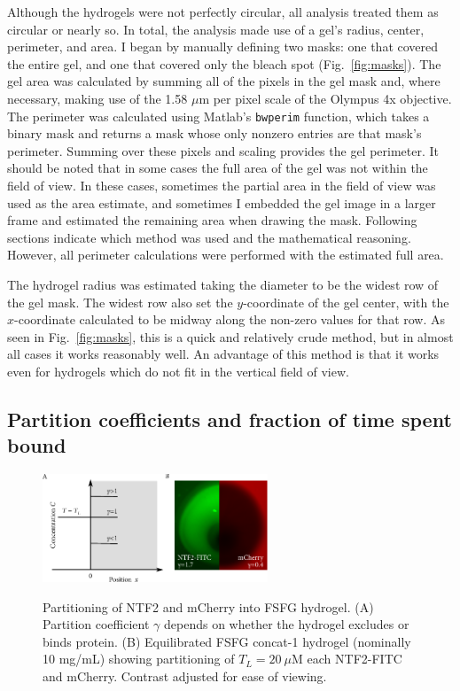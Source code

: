 Although the hydrogels were not perfectly circular, all analysis treated them as circular or nearly so.  In total, the analysis made use of a gel's radius, center, perimeter, and area.  I began by manually defining two masks: one that covered the entire gel, and one that covered only the bleach spot (Fig.~\ref{fig:masks}).  The gel area was calculated by summing all of the pixels in the gel mask and, where necessary, making use of the 1.58 $\mu$m per pixel scale of the Olympus 4x objective.  The perimeter was calculated using Matlab's \texttt{bwperim} function, which takes a binary mask and returns a mask whose only nonzero entries are that mask's perimeter.  Summing over these pixels and scaling provides the gel perimeter.  It should be noted that in some cases the full area of the gel was not within the field of view.  In these cases, sometimes the partial area in the field of view was used as the area estimate, and sometimes I embedded the gel image in a larger frame and estimated the remaining area when drawing the mask.  Following sections indicate which method was used and the mathematical reasoning.  However, all perimeter calculations were performed with the estimated full area.

The hydrogel radius was estimated taking the diameter to be the widest row of the gel mask.  The widest row also set the $y$-coordinate of the gel center, with the $x$-coordinate calculated to be midway along the non-zero values for that row.  As seen in Fig.~\ref{fig:masks}, this is a quick and relatively crude method, but in almost all cases it works reasonably well.  An advantage of this method is that it works even for hydrogels which do not fit in the vertical field of view.

\subsection{Partition coefficients and fraction of time spent bound}
\label{sec:part-coeff}

\begin{figure} 
\caption[Partitioning of NTF2 and mCherry into FSFG hydrogel.]{Partitioning of NTF2 and mCherry into FSFG hydrogel.  (A) Partition coefficient $\gamma$ depends on whether the hydrogel excludes or binds protein. (B) Equilibrated FSFG concat-1 hydrogel (nominally 10 mg/mL) showing partitioning of $T_L = 20\ \mu$M each NTF2-FITC and mCherry.  Contrast adjusted for ease of viewing.\\}
\centering
\includegraphics[width=0.6\textwidth]{figs/ch04/partition.pdf}
\label{fig:partition}
\end{figure}

